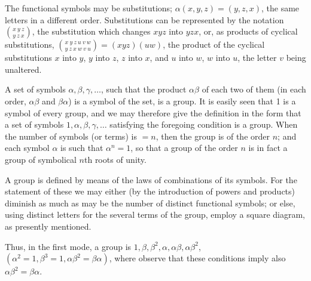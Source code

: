\documentclass[11pt,a4paper]{article}
\begin{document}
The functional symbols may be substitutions; $\alpha(x, y, z) = (y, z, x)$, the same letters in a different order. Substitutions can be represented by the notation $\binom{x\ y\ z}{y\ z\ x}$, the substitution which changes $xyz$ into $yzx$, or, as products of cyclical substitutions, $\binom{x\ y\ z\ u\ v\ w}{y\ z\ x\ w\ v\ u} = (xyz)(uw)$, the product of the cyclical substitutions $x$ into $y$, $y$ into $z$, $z$ into $x$, and $u$ into $w$, $w$ into $u$, the letter $v$ being unaltered.

\newpage


A set of symbols $\alpha, \beta, \gamma, \ldots$, such that the product $\alpha\beta$ of each two of them (in each order, $\alpha\beta$ and $\beta\alpha$) is a symbol of the set, is a group. It is easily seen that 1 is a symbol of every group, and we may therefore give the definition in the form that a set of symbols $1, \alpha, \beta, \gamma, \ldots$ satisfying the foregoing condition is a group. When the number of symbols (or terms) is $= n$, then the group is of the order $n$; and each symbol $\alpha$ is such that $\alpha^{n} = 1$, so that a group of the order $n$ is in fact a group of symbolical $n$th roots of unity.

\medskip

A group is defined by means of the laws of combinations of its symbols. For the statement of these we may either (by the introduction of powers and products) diminish as much as may be the number of distinct functional symbols; or else, using distinct letters for the several terms of the group, employ a square diagram, as presently mentioned.

\medskip

Thus, in the first mode, a group is $1, \beta, \beta^{2}, \alpha, \alpha\beta, \alpha\beta^{2}$, $(\alpha^{2} = 1, \beta^{3} = 1, \alpha\beta^{2} = \beta\alpha)$, where observe that these conditions imply also $\alpha\beta^{2} = \beta\alpha$.

\medskip
\end{document}
